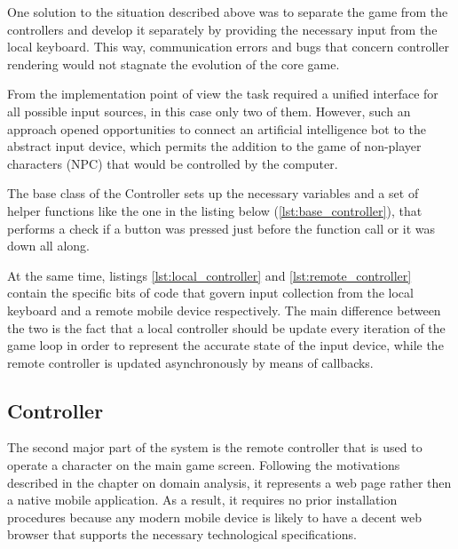 One solution to the situation described above was to separate the game from the
controllers and develop it separately by providing the necessary input from the
local keyboard. This way, communication errors and bugs that concern controller
rendering would not stagnate the evolution of the core game.

From the implementation point of view the task required a unified interface for
all possible input sources, in this case only two of them. However, such an
approach opened opportunities to connect an artificial intelligence bot to the
abstract input device, which permits the addition to the game of non-player
characters (NPC) that would be controlled by the computer.

The base class of the Controller sets up the necessary variables and a set of
helper functions like the one in the listing below (\ref{lst:base_controller}),
that performs a check if a button was pressed just before the function call or
it was down all along.



At the same time, listings \ref{lst:local_controller} and
\ref{lst:remote_controller} contain the specific bits of code that govern input
collection from the local keyboard and a remote mobile device respectively. The
main difference between the two is the fact that a local controller should be
update every iteration of the game loop in order to represent the accurate state
of the input device, while the remote controller is updated asynchronously by
means of callbacks.








\subsection{Controller}

The second major part of the system is the remote controller that is used to
operate a character on the main game screen. Following the motivations described
in the chapter on domain analysis, it represents a web page rather then a native
mobile application. As a result, it requires no prior installation procedures
because any modern mobile device is likely to have a decent web browser that
supports the necessary technological specifications.

